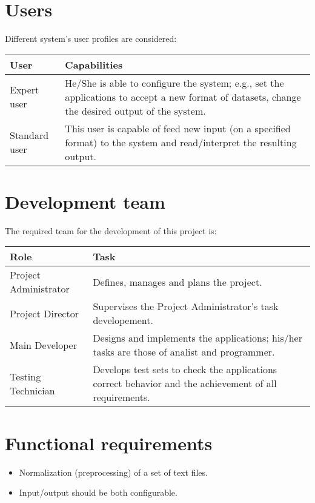 \documentclass[10pt,a4paper]{report}
\begin{document}
	\section{Users}
	
		Different system's user profiles are considered:\\
	
		\begin{tabularx}{\textwidth}{|X|X|}
			\hline
			\textbf{User} & \textbf{Capabilities} \\
			\hline
			Expert user & He/She is able to configure the system; e.g., set the applications to accept a new format of datasets, change the desired output of the system. \\
			\hline
			Standard user & This user is capable of feed new input (on a specified format) to the system and read/interpret the resulting output. \\
			\hline
		\end{tabularx}
		
	\section{Development team}
	
		The required team for the development of this project is:\\
		
		\begin{tabularx}{\textwidth}{|X|X|}
			\hline
			\textbf{Role} & \textbf{Task} \\
			\hline
			Project Administrator & Defines, manages and plans the project. \\
			\hline
			Project Director & Supervises the Project Administrator's task developement. \\
			\hline
			Main Developer & Designs and implements the applications; his/her tasks are those of analist and programmer. \\
			\hline
			Testing Technician & Develops test sets to check the applications correct behavior and the achievement of all requirements. \\
			\hline
		\end{tabularx}

	\section{Functional requirements}
		\begin{itemize}
			\item Normalization (preprocessing) of a set of text files.
			\item Input/output should be both configurable.
		\end{itemize}
\end{document}
